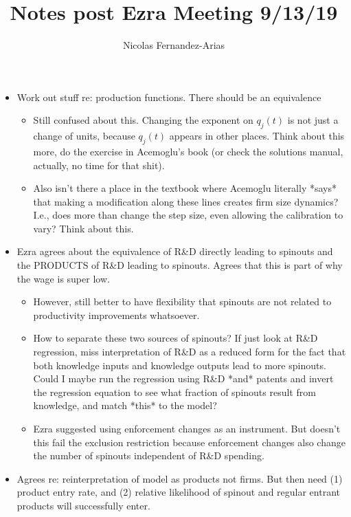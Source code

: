 \documentclass[12pt,english]{article}
\theoremstyle{remark}
\begin{document}
	
\title{Notes post Ezra Meeting 9/13/19}
\author{Nicolas Fernandez-Arias}
\maketitle

\begin{itemize}
	\item Work out stuff re: production functions. There should be an equivalence 
	\begin{itemize}
		\item Still confused about this. Changing the exponent on $q_j(t)$ is not just a change of units, because $q_j(t)$ appears in other places. Think about this more, do the exercise in Acemoglu's book (or check the solutions manual, actually, no time for that shit).
		\item Also isn't there a place in the textbook where Acemoglu literally *says* that making a modification along these lines creates firm size dynamics? I.e., does more than change the step size, even allowing the calibration to vary? Think about this.
	\end{itemize}
	\item Ezra agrees about the equivalence of R\&D directly leading to spinouts and the PRODUCTS of R\&D leading to spinouts. Agrees that this is part of why the wage is super low. 
	\begin{itemize}
		\item However, still better to have flexibility that spinouts are not related to productivity improvements whatsoever. 
		\item How to separate these two sources of spinouts? If just look at R\&D regression, miss interpretation of R\&D as a reduced form for the fact that both knowledge inputs and knowledge outputs lead to more spinouts. Could I maybe run the regression using R\&D *and* patents and invert the regression equation to see what fraction of spinouts result from knowledge, and match *this* to the model? 
		\item Ezra suggested using enforcement changes as an instrument. But doesn't this fail the exclusion restriction because enforcement changes also change the number of spinouts independent of R\&D spending.
	\end{itemize}
	\item Agrees re: reinterpretation of model as products not firms. But then need (1) product entry rate, and (2) relative likelihood of spinout and regular entrant products will successfully enter. 
	\begin{itemize}

\end{itemize}
\end{itemize}
\end{document}
